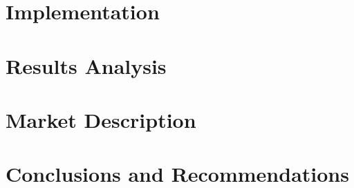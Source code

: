 \documentclass[manuscript,screen,nonacm]{acmart}
\begin{document}
\section{Implementation}

\FloatBarrier
{}
\section{Results Analysis}

\section{Market Description}

\section{Conclusions and Recommendations}



\end{document}
